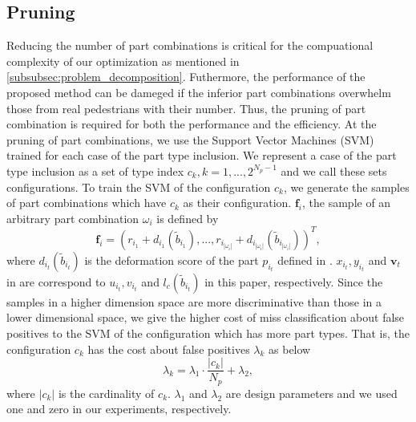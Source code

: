 \documentclass[10pt,twocolumn,letterpaper]{article}
\begin{document}
\subsection{Pruning}
\label{subsec:pruning}
Reducing the number of part combinations is critical for the compuational complexity of our optimization as mentioned in \ref{subsubsec:problem_decomposition}.
Futhermore, the performance of the proposed method can be dameged if the inferior part combinations overwhelm those from real pedestrians with their number.
Thus, the pruning of part combination is required for both the performance and the efficiency.
At the pruning of part combinations, we use the Support Vector Machines (SVM)~\cite{cortes1995support} trained for each case of the part type inclusion.
We represent a case of the part type inclusion as a set of type index $c_k, k=1,...,2^{N_p-1}$ and we call these sets configurations.
To train the SVM of the configuration $c_k$, we generate the samples of part combinations which have $c_k$ as their configuration.
$\mathbf{f}_i$, the sample of an arbitrary part combination $\omega_i$ is defined by
\begin{equation}
   \label{eq:svm_sample_vector}
   \mathbf{f}_i = (r_{i_1}+d_{i_1}(\tilde{b}_{i_1}), ..., r_{i_{|\omega_i|}}+d_{i_{|\omega_i|}}(\tilde{b}_{i_{|\omega_i|}}))^T,
\end{equation}
where $d_{i_t}(\tilde{b}_{i_t})$ is the deformation score of the part $p_{i_t} $ defined in \cite{felzenszwalb2010object}. 
$x_{i_t},y_{i_t}$ and $\mathbf{v}_t$ in \cite{felzenszwalb2010object} are correspond to $u_{i_t},v_{i_t}$ and $l_c(\tilde{b}_{i_t})$ in this paper, respectively.
Since the samples in a higher dimension space are more discriminative than those in a lower dimensional space, we give the higher cost of miss classification about false positives to the SVM of the configuration which has more part types.
That is, the configuration $c_k$ has the cost about false positives $\lambda_k$ as below
\begin{equation}
   \label{eq:svm_fp_cost}
   \lambda_k = \lambda_{1} \cdot \frac{|c_k|}{N_p} + \lambda_{2},
\end{equation}
where $|c_k|$ is the cardinality of $c_k$. $\lambda_{1}$ and $\lambda_{2}$ are design parameters and we used one and zero in our experiments, respectively.
\end{document}
